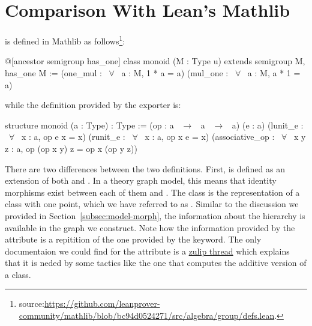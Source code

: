 
\section{Comparison With Lean's Mathlib}
\label{sec:lean_comparison}
 is defined in Mathlib as follows\footnote{source:\url{https://github.com/leanprover-community/mathlib/blob/bc94d0524271/src/algebra/group/defs.lean}.}: 
\begin{leancode} 
@[ancestor semigroup has_one]
class monoid (M : Type u) extends semigroup M, has_one M :=
  (one_mul : ~$\forall$~ a : M, 1 * a = a) (mul_one : ~$\forall$~ a : M, a * 1 = a)
\end{leancode} 
\noindent while the definition provided by the exporter is: 
\begin{leancode} 
structure monoid (a : Type) : Type := 
  (op : a ~$\to$~ a ~$\to$~ a)
  (e  : a)
  (lunit_e : ~$\forall$~ {x : a}, op e x = x)
  (runit_e : ~$\forall$~ {x : a}, op x e = x)
  (associative_op : ~$\forall$~ {x y z : a}, op (op x y) z = op x (op y z)) 
\end{leancode} 
There are two differences between the two definitions. First,  is defined as an extension of both  and . 
In a theory graph model, this means that identity morphisms exist between each of them and . The  class is the representation of a class with one point, which we have referred to as . 
Similar to the discussion we provided in Section~\ref{subsec:model-morph}, the information about the hierarchy is available in the graph we construct. 
Note how the information provided by the  attribute is a repitition of the one provided by the  keyword. The only documentaion we could find for the  attribute is a 
\href{https://leanprover.zulipchat.com/#narrow/stream/113488-general/topic/ancestor}{zulip thread}
which explains that it is neded by some tactics like the one that computes the additive version of a class. 

